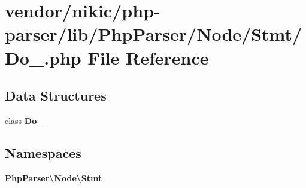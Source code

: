 \section{vendor/nikic/php-\/parser/lib/\+Php\+Parser/\+Node/\+Stmt/\+Do\+\_\+.php File Reference}
\label{_do___8php}
\subsection*{Data Structures}
\begin{DoxyCompactItemize}
\item 
class {\bf Do\+\_\+}
\end{DoxyCompactItemize}
\subsection*{Namespaces}
\begin{DoxyCompactItemize}
\item 
 {\bf Php\+Parser\textbackslash{}\+Node\textbackslash{}\+Stmt}
\end{DoxyCompactItemize}
